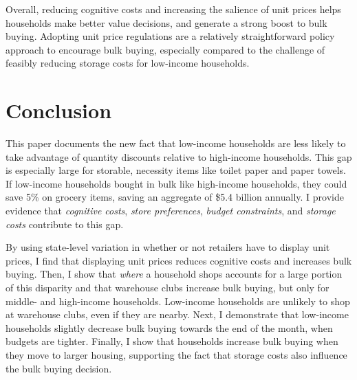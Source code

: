 \documentclass[AER]{AEA_mal}
\begin{document}
Overall, reducing cognitive costs and increasing the salience of unit prices helps households make better value decisions, and generate a strong boost to bulk buying. Adopting unit price regulations are a relatively straightforward policy approach to encourage bulk buying, especially compared to the challenge of feasibly reducing storage costs for low-income households.


%
%  
%

\section{Conclusion}
\label{conclusion}

This paper documents the new fact that low-income households are less likely to take advantage of quantity discounts relative to high-income households. This gap is especially large for storable, necessity items like toilet paper and paper towels. If low-income households bought in bulk like high-income households, they could save 5\% on grocery items, saving an aggregate of \$5.4 billion annually. I provide evidence that \textit{cognitive costs}, \textit{store preferences}, \textit{budget constraints}, and \textit{storage costs} contribute to this gap.

By using state-level variation in whether or not retailers have to display unit prices, I find that displaying unit prices reduces cognitive costs and increases bulk buying. Then, I show that \textit{where} a household shops accounts for a large portion of this disparity and that warehouse clubs increase bulk buying, but only for middle- and high-income households. Low-income households are unlikely to shop at warehouse clubs, even if they are nearby. Next, I demonstrate that low-income households slightly decrease bulk buying towards the end of the month, when budgets are tighter. Finally, I show that households increase bulk buying when they move to larger housing, supporting the fact that storage costs also influence the bulk buying decision.
\end{document}
